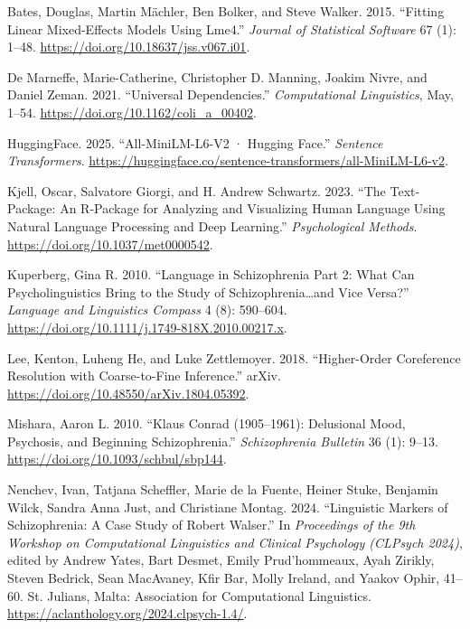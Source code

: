 \documentclass[
  12pt,
  oneside]{book}
\newlength{\cslhangindent}
\newenvironment{CSLReferences}[2] %
 {\begin{list}{}{%
  \setlength{\itemindent}{0pt}
  \setlength{\leftmargin}{0pt}
  \setlength{\parsep}{0pt}
  \ifodd #1
   \setlength{\leftmargin}{\cslhangindent}
   \setlength{\itemindent}{-1\cslhangindent}
  \fi
  \setlength{\itemsep}{#2\baselineskip}}}
 {\end{list}}
\begin{document}
\label{refs}
\begin{CSLReferences}{1}{0}
Bates, Douglas, Martin Mächler, Ben Bolker, and Steve Walker. 2015. {``Fitting {Linear} {Mixed}-{Effects} {Models} {Using} Lme4.''} \emph{Journal of Statistical Software} 67 (1): 1--48. \url{https://doi.org/10.18637/jss.v067.i01}.

De Marneffe, Marie-Catherine, Christopher D. Manning, Joakim Nivre, and Daniel Zeman. 2021. {``Universal {Dependencies}.''} \emph{Computational Linguistics}, May, 1--54. \url{https://doi.org/10.1162/coli_a_00402}.

HuggingFace. 2025. {``All-{MiniLM}-{L6}-V2 · {Hugging} {Face}.''} \emph{Sentence Transformers}. \url{https://huggingface.co/sentence-transformers/all-MiniLM-L6-v2}.

Kjell, Oscar, Salvatore Giorgi, and H. Andrew Schwartz. 2023. {``The Text-Package: {An} {R}-Package for {Analyzing} and {Visualizing} {Human} {Language} {Using} {Natural} {Language} {Processing} and {Deep} {Learning}.''} \emph{Psychological Methods}. \url{https://doi.org/10.1037/met0000542}.

Kuperberg, Gina R. 2010. {``Language in Schizophrenia {Part} 2: {What} Can Psycholinguistics Bring to the Study of Schizophrenia\ldots and Vice Versa?''} \emph{Language and Linguistics Compass} 4 (8): 590--604. \url{https://doi.org/10.1111/j.1749-818X.2010.00217.x}.

Lee, Kenton, Luheng He, and Luke Zettlemoyer. 2018. {``Higher-Order {Coreference} {Resolution} with {Coarse}-to-Fine {Inference}.''} arXiv. \url{https://doi.org/10.48550/arXiv.1804.05392}.

Mishara, Aaron L. 2010. {``Klaus {Conrad} (1905--1961): {Delusional} {Mood}, {Psychosis}, and {Beginning} {Schizophrenia}.''} \emph{Schizophrenia Bulletin} 36 (1): 9--13. \url{https://doi.org/10.1093/schbul/sbp144}.

Nenchev, Ivan, Tatjana Scheffler, Marie de la Fuente, Heiner Stuke, Benjamin Wilck, Sandra Anna Just, and Christiane Montag. 2024. {``Linguistic Markers of Schizophrenia: A Case Study of {Robert} {Walser}.''} In \emph{Proceedings of the 9th {Workshop} on {Computational} {Linguistics} and {Clinical} {Psychology} ({CLPsych} 2024)}, edited by Andrew Yates, Bart Desmet, Emily Prud'hommeaux, Ayah Zirikly, Steven Bedrick, Sean MacAvaney, Kfir Bar, Molly Ireland, and Yaakov Ophir, 41--60. St. Julians, Malta: Association for Computational Linguistics. \url{https://aclanthology.org/2024.clpsych-1.4/}.


\end{CSLReferences}
\end{document}
